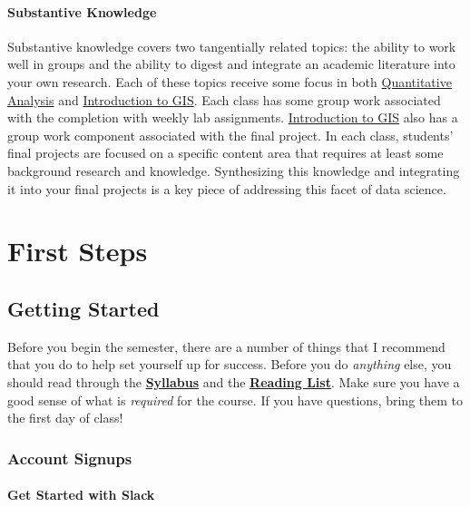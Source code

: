 \documentclass[]{book}
\theoremstyle{definition}
\theoremstyle{definition}
\theoremstyle{definition}
\theoremstyle{remark}
\begin{document}
\subsection{Substantive Knowledge}\label{substantive-knowledge}

Substantive knowledge covers two tangentially related topics: the
ability to work well in groups and the ability to digest and integrate
an academic literature into your own research. Each of these topics
receive some focus in both
\href{https://slu-soc5050.github.io}{Quantitative Analysis} and
\href{https://slu-soc5650.github.io}{Introduction to GIS}. Each class
has some group work associated with the completion with weekly lab
assignments. \href{https://slu-soc5650.github.io}{Introduction to GIS}
also has a group work component associated with the final project. In
each class, students' final projects are focused on a specific content
area that requires at least some background research and knowledge.
Synthesizing this knowledge and integrating it into your final projects
is a key piece of addressing this facet of data science.

\part{First Steps}\label{part-first-steps}

\chapter{Getting Started}\label{gettingStarted}

Before you begin the semester, there are a number of things that I
recommend that you do to help set yourself up for success. Before you do
\emph{anything} else, you should read through the
\href{https://cdn.rawgit.com/slu-soc5050/Core-Documents/bdcce556/syllabus.pdf}{\textbf{Syllabus}}
and the
\href{https://cdn.rawgit.com/slu-soc5050/Core-Documents/bdcce556/reading-list.pdf}{\textbf{Reading
List}}. Make sure you have a good sense of what is \emph{required} for
the course. If you have questions, bring them to the first day of class!

\section{Account Signups}\label{account-signups}

\subsection{Get Started with Slack}\label{get-started-with-slack}
\end{document}
